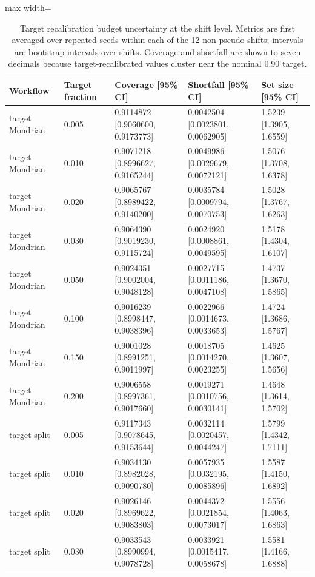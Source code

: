 \begin{table}[!tbp]
\centering
\caption{Target recalibration budget uncertainty at the shift level. Metrics are first averaged over repeated seeds within each of the 12 non-pseudo shifts; intervals are bootstrap intervals over shifts. Coverage and shortfall are shown to seven decimals because target-recalibrated values cluster near the nominal 0.90 target.}
\label{tab:target_budget_shift_uncertainty}
\tiny
\setlength{\tabcolsep}{2pt}
\renewcommand{\arraystretch}{1.08}
\begin{adjustbox}{max width=\textwidth}
\begin{tabular}{@{}lllll@{}}
\toprule
Workflow & Target fraction & Coverage [95\% CI] & Shortfall [95\% CI] & Set size [95\% CI] \\
\midrule
target Mondrian & 0.005 & 0.9114872 [0.9060600, 0.9173773] & 0.0042504 [0.0023801, 0.0062905] & 1.5239 [1.3905, 1.6559] \\
target Mondrian & 0.010 & 0.9071218 [0.8996627, 0.9165244] & 0.0049986 [0.0029679, 0.0072121] & 1.5076 [1.3708, 1.6378] \\
target Mondrian & 0.020 & 0.9065767 [0.8989422, 0.9140200] & 0.0035784 [0.0009794, 0.0070753] & 1.5028 [1.3767, 1.6263] \\
target Mondrian & 0.030 & 0.9064390 [0.9019230, 0.9115724] & 0.0024920 [0.0008861, 0.0049595] & 1.5178 [1.4304, 1.6107] \\
target Mondrian & 0.050 & 0.9024351 [0.9002004, 0.9048128] & 0.0027715 [0.0011186, 0.0047108] & 1.4737 [1.3670, 1.5865] \\
target Mondrian & 0.100 & 0.9016239 [0.8998447, 0.9038396] & 0.0022966 [0.0014673, 0.0033653] & 1.4724 [1.3686, 1.5767] \\
target Mondrian & 0.150 & 0.9001028 [0.8991251, 0.9011997] & 0.0018705 [0.0014270, 0.0023255] & 1.4625 [1.3607, 1.5656] \\
target Mondrian & 0.200 & 0.9006558 [0.8997361, 0.9017660] & 0.0019271 [0.0010756, 0.0030141] & 1.4648 [1.3614, 1.5702] \\
target split & 0.005 & 0.9117343 [0.9078645, 0.9153644] & 0.0032114 [0.0020457, 0.0044247] & 1.5799 [1.4342, 1.7111] \\
target split & 0.010 & 0.9034130 [0.8982028, 0.9090780] & 0.0057935 [0.0032195, 0.0085896] & 1.5587 [1.4150, 1.6892] \\
target split & 0.020 & 0.9026146 [0.8969622, 0.9083803] & 0.0044372 [0.0021854, 0.0073017] & 1.5556 [1.4063, 1.6863] \\
target split & 0.030 & 0.9033543 [0.8990994, 0.9078728] & 0.0033921 [0.0015417, 0.0058678] & 1.5581 [1.4166, 1.6888] \\

\end{tabular}
\end{adjustbox}
\end{table}
